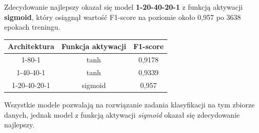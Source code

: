 \documentclass{article}
\begin{document}
Zdecydowanie najlepszy okazał się model \textbf{1-20-40-20-1} z funkcją aktywacji \textbf{sigmoid}, który osiągnął wartość F1-score na poziomie około 0{,}957 po 3638 epokach treningu.

\begin{center}
\begin{tabular}{|c|c|c|}
    \hline
    Architektura & Funkcja aktywacji & F1-score \\
    \hline
    1-80-1 & tanh & 0,9178 \\
    1-40-40-1 & tanh & 0,9339 \\
    1-20-40-20-1 & sigmoid & 0,957 \\
    \hline
\end{tabular}
\end{center}

Wszystkie modele pozwalają na rozwiązanie zadania klasyfikacji na tym zbiorze danych, jednak model z funkcją aktywacji \textit{sigmoid} okazał się zdecydowanie najlepszy.
\end{document}
